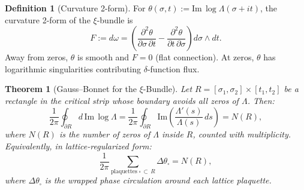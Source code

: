 \documentclass[11pt, a4paper]{article}
\theoremstyle{definition}
\newtheorem{definition}{Definition}[section]
\theoremstyle{plain}
\newtheorem{theorem}{Theorem}[section]
\newcommand{\xif}{\xi}                      %
\begin{document}
\begin{definition}[Curvature 2-form]
\label{def:curvature_2form}
For $\theta(\sigma,t) := \mathrm{Im}\,\log\Lambda(\sigma + it)$,
the curvature 2-form of the $\xif$-bundle is
\begin{equation}
  F := d\omega = \left(\frac{\partial^2\theta}{\partial\sigma\,\partial t}
  - \frac{\partial^2\theta}{\partial t\,\partial\sigma}\right)
  d\sigma \wedge dt.
  \label{eq:curvature_2form}
\end{equation}
Away from zeros, $\theta$ is smooth and $F = 0$ (flat connection).
At zeros, $\theta$ has logarithmic singularities contributing
$\delta$-function flux.
\end{definition}

\begin{theorem}[Gauss--Bonnet for the $\xif$-Bundle]
\label{thm:gauss_bonnet}
Let $R = [\sigma_1,\sigma_2] \times [t_1, t_2]$ be a rectangle in the
critical strip whose boundary avoids all zeros of $\Lambda$. Then:
\begin{equation}
  \frac{1}{2\pi}\oint_{\partial R} d\,\mathrm{Im}\,\log\Lambda
  = \frac{1}{2\pi}\oint_{\partial R} \mathrm{Im}\!\left(
  \frac{\Lambda'(s)}{\Lambda(s)}\,ds\right)
  = N(R),
  \label{eq:gauss_bonnet}
\end{equation}
where $N(R)$ is the number of zeros of $\Lambda$ inside $R$, counted
with multiplicity. Equivalently, in lattice-regularized form:
\begin{equation}
  \frac{1}{2\pi}\sum_{\mathrm{plaquettes}\;\square\,\subset\,R}
  \Delta\theta_{\square} = N(R),
  \label{eq:gauss_bonnet_lattice}
\end{equation}
where $\Delta\theta_\square$ is the wrapped phase circulation around
each lattice plaquette.
\end{theorem}
\end{document}
